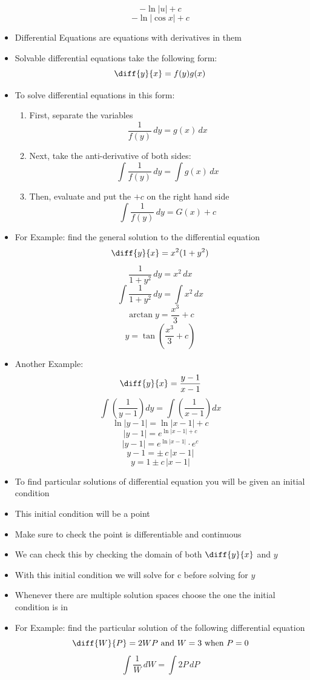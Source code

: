 \documentclass{article}
\begin{document}
\begin{itemize}
        \[-\ln|u|+c\]
        \[\boxed{-\ln|\cos x|+c}\]
    \item Differential Equations are equations with derivatives in them
    \item Solvable differential equations take the following form:
        \[\diff{y}{x} = f(y)g(x)\]
    \item To solve differential equations in this form:
    \begin{enumerate}
        \item First, separate the variables
            \[\frac{1}{f(y)}\,dy = g(x)\,dx\]
        \item Next, take the anti-derivative of both sides:
            \[\int\frac{1}{f(y)}\,dy = \int g(x)\,dx\]
        \item Then, evaluate and put the $+c$ on the right hand side
            \[\int\frac{1}{f(y)}\,dy = G(x)+c\]
    \end{enumerate}
    \item For Example: find the general solution to the differential equation
        \[\diff{y}{x} = x^2(1+y^2)\]
        \[\frac{1}{1+y^2}\,dy = x^2\,dx\]
        \[\int\frac{1}{1+y^2}\,dy = \int x^2\,dx\]
        \[\arctan y = \frac{x^3}{3}+c\]
        \[y = \tan\left(\frac{x^3}{3}+c\right)\]
    \item Another Example:
        \[\diff{y}{x} = \frac{y-1}{x-1}\]
        \[\int\left(\frac{1}{y-1}\right)dy = \int\left(\frac{1}{x-1}\right)dx\]
        \[\ln|y-1| = \ln|x-1|+c\]
        \[|y-1| = e^{\ln|x-1|+c}\]
        \[|y-1| = e^{\ln|x-1|}\cdot e^c\]
        \[y-1 = \pm\,c\,|x-1|\]
        \[y = 1\pm c\,|x-1|\]
    \item To find particular solutions of differential equation you will be given an initial condition
    \item This initial condition will be a point
    \item Make sure to check the point is differentiable and continuous
    \item We can check this by checking the domain of both $\diff{y}{x}$ and $y$
    \item With this initial condition we will solve for c before solving for $y$
    \item Whenever there are multiple solution spaces choose the one the initial condition is in
    \item For Example: find the particular solution of the following differential equation
        \[\diff{W}{P} = 2WP\text{ and } W = 3 \text{ when } P = 0\]
        \[\int\frac{1}{W}\,dW = \int2P\,dP\]

\end{itemize}
\end{document}
